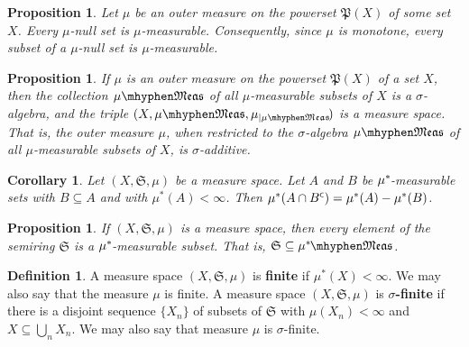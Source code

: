 \documentclass[
twoside=true,
paper=letter,
fontsize=9pt,
pagesize=auto,
leqno,
openany,
headsepline,
overfullrule,
]{scrbook}
\theoremstyle{plain}
\theoremstyle{plain}
\newtheorem{prop}[thm]{Proposition}
\newtheorem{cor}[thm]{Corollary}
\theoremstyle{definition}
\newtheorem{defn}[thm]{Definition}
\theoremstyle{bfnoteitalic}
\theoremstyle{bfnoteroman}
\newcommand{\sigalg}[1]{\mathfrak{#1}}
\newcommand{\textsigma}{\hbox{\large{$\sigma$}}\kern-1pt}
\newcommand{\restrictedto}[1]{_{\lvert#1}\kern-1.5pt}
\newcommand{\comp}{^{\hbox{\tiny{$\mathsf C$}}}}
\newcommand{\meets}{\cap}
\newcommand{\semiring}{\sigalg{S}}
\newcommand{\powerset}{\mathfrak{P}}
\newcommand{\measurable}[1]{{#1}\mhyphen\mathfrak{Meas}}
\newcommand{\kernast}{\ast\kern-1pt}
\newcommand{\measurespace}{X}
\newcommand{\measure}{\mu}
\begin{document}
\begin{prop}
Let $\measure$ be an outer measure on the powerset $\powerset(\measurespace)$ of some set $\measurespace$.
Every $\measure$\hyp{}null set is $\measure$\hyp{}measurable. 
Consequently, since $\measure$ is monotone,  every subset of a $\measure$\hyp{}null set is 
$\measure$\hyp{}measurable.
\end{prop}




\begin{prop}\label{restricted_outer_measure}
If $\measure$ is an outer measure on the powerset $\powerset(\measurespace)$ of a set $\measurespace$, then the collection $\measurable{\measure}$ of all $\measure$\hyp{}measurable subsets of $\measurespace$ is a \textsigma-algebra, and the triple $(\measurespace, \measurable{\measure}, \measure\restrictedto{\measurable{\measure}})$ is a measure space.  That is, the outer measure $\measure$, when restricted to the \textsigma-algebra $\measurable{\measure}$ of all $\measure$\hyp{}measurable subsets of $\measurespace$, is \textsigma-additive.
\end{prop}



\begin{cor}\label{subtractive}
Let $(\measurespace, \semiring, \measure)$ be a measure space. Let $A$ and $B$ be $\measure^\kernast$\hyp{}measurable sets with $B\subseteq A$ and with $\measure^*(A)< \infty$.
Then $\measure^*(A\meets B\comp) = \measure^*(A) - \measure^*(B)$.
\end{cor}




\begin{prop}\label{semiring_measurable}
If $(\measurespace, \semiring, \measure)$ is a measure space, then every element of the semiring 
$\semiring$ is a $\measure^\kernast$\hyp{}measurable subset. That is, 
$\semiring\subseteq \measurable{\measure^\kernast}$.
\end{prop}



\begin{defn}\label{sigma_finite}
A measure space $(\measurespace, \semiring, \measure)$ is 
\textbf{finite}
if $\measure^*(\measurespace) < \infty$. We may also say that the measure $\measure$ is finite.
A measure space $(\measurespace, \semiring, \measure)$ is 
\textbf{\textsigma-finite}
\index{sigma finite@$\textsigma$-finite}
if there is a disjoint sequence $\{ \measurespace_n \}$ of subsets of $\semiring$ with 
$\measure(\measurespace_n) < \infty$ 
and 
$\measurespace\subseteq\bigcup_n\measurespace_n$. 
We may also say that measure $\measure$ is \textsigma\hyp{}finite.
\end{defn}
\end{document}
